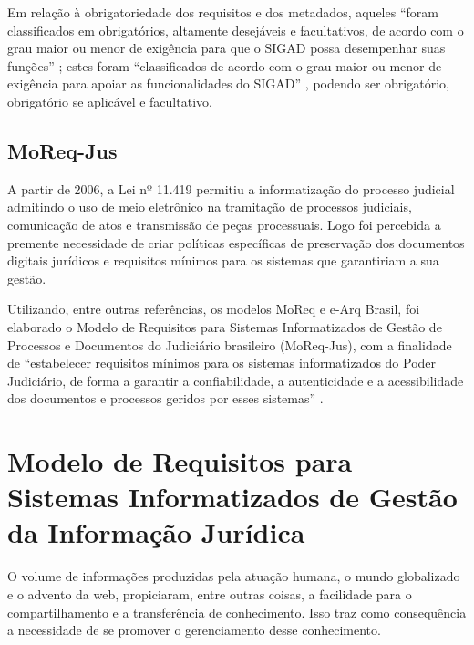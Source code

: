 \documentclass[a4paper,11pt,openright,twoside,english,brazil]{abntex2}
\begin{document}
Em relação à obrigatoriedade dos requisitos e dos metadados, aqueles ``foram
classificados em obrigatórios, altamente desejáveis e facultativos, de acordo
com o grau maior ou menor de exigência para que o SIGAD possa desempenhar suas
funções'' \cite[p.~16]{conarq2009}; estes foram ``classificados de acordo com o
grau maior ou menor de exigência para apoiar as funcionalidades do SIGAD''
\cite[p.~16]{conarq2009}, podendo ser obrigatório, obrigatório se aplicável e
facultativo.

\section{MoReq-Jus}

A partir de 2006, a Lei nº 11.419 permitiu a informatização do processo judicial
admitindo o uso de meio eletrônico na tramitação de processos judiciais,
comunicação de atos e transmissão de peças processuais. Logo foi percebida a
premente necessidade de criar políticas específicas de preservação dos
documentos digitais jurídicos e requisitos mínimos para os sistemas que
garantiriam a sua gestão.

Utilizando, entre outras referências, os modelos MoReq e e-Arq Brasil, foi
elaborado o Modelo de Requisitos para Sistemas Informatizados de Gestão de
Processos e Documentos do Judiciário brasileiro (MoReq-Jus), com a finalidade de
``estabelecer requisitos mínimos para os sistemas informatizados do Poder
Judiciário, de forma a garantir a confiabilidade, a autenticidade e a
acessibilidade dos documentos e processos geridos por esses sistemas''
\cite[p.~5]{cnj2009}.



\chapter{Modelo de Requisitos para Sistemas Informatizados de Gestão da 
Informação Jurídica}


 
O volume de informações produzidas pela atuação humana, o mundo globalizado e o
advento da web, propiciaram, entre outras coisas, a facilidade para o
compartilhamento e a transferência de conhecimento.
Isso traz como consequência a necessidade de se promover o gerenciamento desse
conhecimento.
\end{document}

